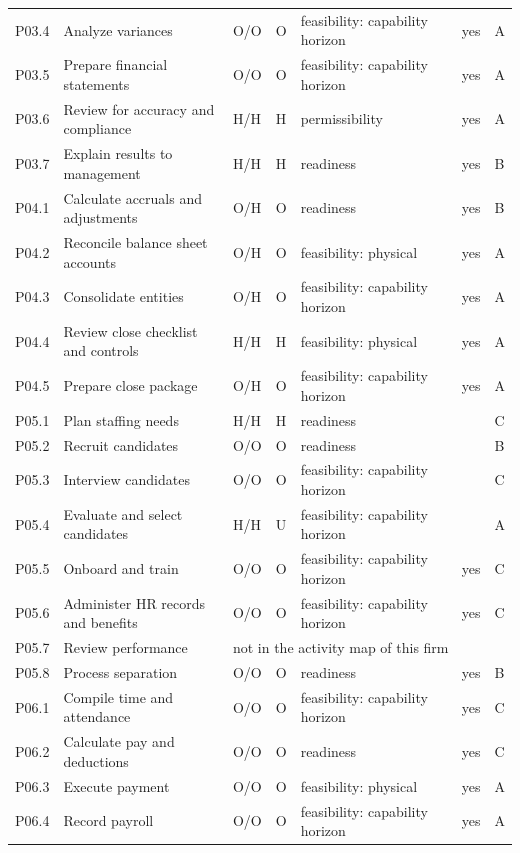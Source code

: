 \begin{longtable}{@{}lp{4.4cm}llp{4.2cm}rll@{}}
P03.4 & Analyze variances & O/O & O & feasibility: capability horizon &  & yes & A \\
P03.5 & Prepare financial statements & O/O & O & feasibility: capability horizon &  & yes & A \\
P03.6 & Review for accuracy and compliance & H/H & H & permissibility &  & yes & A \\
P03.7 & Explain results to management & H/H & H & readiness &  & yes & B \\
P04.1 & Calculate accruals and adjustments & O/H & O & readiness &  & yes & B \\
P04.2 & Reconcile balance sheet accounts & O/H & O & feasibility: physical &  & yes & A \\
P04.3 & Consolidate entities & O/H & O & feasibility: capability horizon &  & yes & A \\
P04.4 & Review close checklist and controls & H/H & H & feasibility: physical &  & yes & A \\
P04.5 & Prepare close package & O/H & O & feasibility: capability horizon &  & yes & A \\
P05.1 & Plan staffing needs & H/H & H & readiness &  &  & C \\
P05.2 & Recruit candidates & O/O & O & readiness &  &  & B \\
P05.3 & Interview candidates & O/O & O & feasibility: capability horizon &  &  & C \\
P05.4 & Evaluate and select candidates & H/H & U & feasibility: capability horizon &  &  & A \\
P05.5 & Onboard and train & O/O & O & feasibility: capability horizon &  & yes & C \\
P05.6 & Administer HR records and benefits & O/O & O & feasibility: capability horizon &  & yes & C \\
P05.7 & Review performance & \multicolumn{6}{l}{not in the activity map of this firm} \\
P05.8 & Process separation & O/O & O & readiness &  & yes & B \\
P06.1 & Compile time and attendance & O/O & O & feasibility: capability horizon &  & yes & C \\
P06.2 & Calculate pay and deductions & O/O & O & readiness &  & yes & C \\
P06.3 & Execute payment & O/O & O & feasibility: physical &  & yes & A \\
P06.4 & Record payroll & O/O & O & feasibility: capability horizon &  & yes & A \\

\end{longtable}
